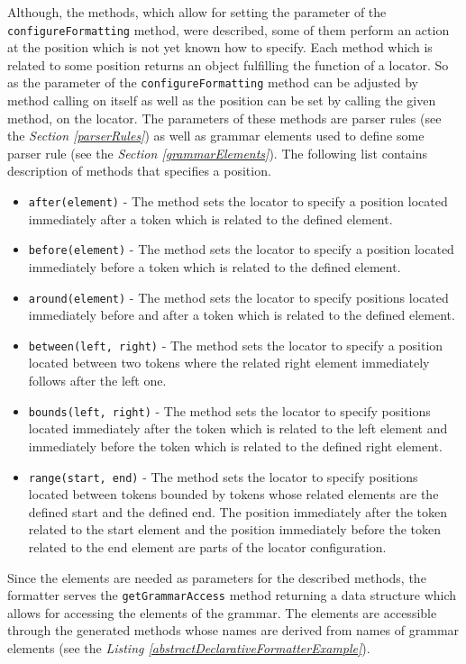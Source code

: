 \documentclass[12pt,notitlepage,a4paper]{report}
\begin{document}
Although, the methods, which allow for setting the parameter of the \texttt{configureFormatting} method, were described, some of them perform an action at the position which is not yet known how to specify. Each method which is related to some position returns an object fulfilling the function of a locator. So as the parameter of the \texttt{configureFormatting} method can be adjusted by method calling on itself as well as the position can be set by calling the given method, on the locator. The parameters of these methods are parser rules (see the \textit{Section \ref{parserRules}}) as well as grammar elements used to define some parser rule (see the \textit{Section \ref{grammarElements}}). The following list contains description of methods that specifies a position.
\begin{itemize}
\item \texttt{after(element)} - The method sets the locator to specify a position located immediately after a token which is related to the defined element.
\item \texttt{before(element)} - The method sets the locator to specify a position located immediately before a token which is related to the defined element.
\item \texttt{around(element)} - The method sets the locator to specify positions located immediately before and after a token which is related to the defined element.
\item \texttt{between(left, right)} - The method sets the locator to specify a position located between two tokens where the related right element immediately follows after the left one.
\item \texttt{bounds(left, right)} - The method sets the locator to specify positions located immediately after the token which is related to the left element and immediately before the token which is related to the defined right element.
\item \texttt{range(start, end)} - The method sets the locator to specify positions located between tokens bounded by tokens whose related elements are the defined start and the defined end. The position immediately after the token related to the start element and the position immediately before the token related to the end element are parts of the locator configuration.
\end{itemize}

Since the elements are needed as parameters for the described methods, the formatter serves the \texttt{getGrammarAccess} method returning a data structure which allows for accessing the elements of the grammar. The elements are accessible through the generated methods whose names are derived from names of grammar elements (see the \textit{Listing \ref{abstractDeclarativeFormatterExample}}). 
\end{document}
